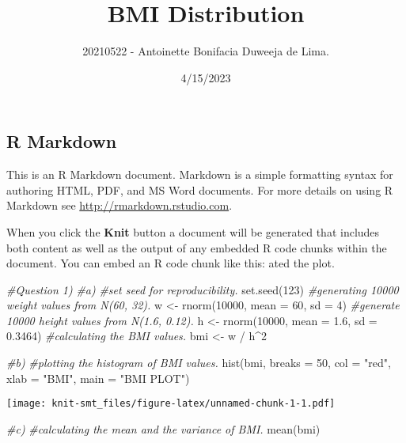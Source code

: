 \documentclass[
]{article}
\title{BMI Distribution}
\author{20210522 - Antoinette Bonifacia Duweeja de Lima.}
\date{4/15/2023}
\newenvironment{Shaded}{\begin{snugshade}}{\end{snugshade}}
\newcommand{\AttributeTok}[1]{\textcolor[rgb]{0.77,0.63,0.00}{#1}}
\newcommand{\CommentTok}[1]{\textcolor[rgb]{0.56,0.35,0.01}{\textit{#1}}}
\newcommand{\DecValTok}[1]{\textcolor[rgb]{0.00,0.00,0.81}{#1}}
\newcommand{\FloatTok}[1]{\textcolor[rgb]{0.00,0.00,0.81}{#1}}
\newcommand{\FunctionTok}[1]{\textcolor[rgb]{0.00,0.00,0.00}{#1}}
\newcommand{\NormalTok}[1]{#1}
\newcommand{\OtherTok}[1]{\textcolor[rgb]{0.56,0.35,0.01}{#1}}
\newcommand{\SpecialCharTok}[1]{\textcolor[rgb]{0.00,0.00,0.00}{#1}}
\newcommand{\StringTok}[1]{\textcolor[rgb]{0.31,0.60,0.02}{#1}}
\begin{document}
\maketitle

\hypertarget{r-markdown}{%
\subsection{R Markdown}\label{r-markdown}}

This is an R Markdown document. Markdown is a simple formatting syntax
for authoring HTML, PDF, and MS Word documents. For more details on
using R Markdown see \url{http://rmarkdown.rstudio.com}.

When you click the \textbf{Knit} button a document will be generated
that includes both content as well as the output of any embedded R code
chunks within the document. You can embed an R code chunk like this:
ated the plot.

\begin{Shaded}
\begin{Highlighting}[]
\CommentTok{\#Question 1)}
\CommentTok{\#a)}
\CommentTok{\#set seed for reproducibility.}
\FunctionTok{set.seed}\NormalTok{(}\DecValTok{123}\NormalTok{)}
\CommentTok{\#generating 10000 weight values from N(60, 32).}
\NormalTok{w }\OtherTok{\textless{}{-}} \FunctionTok{rnorm}\NormalTok{(}\DecValTok{10000}\NormalTok{, }\AttributeTok{mean =} \DecValTok{60}\NormalTok{, }\AttributeTok{sd =} \DecValTok{4}\NormalTok{)}
\CommentTok{\#generate 10000 height values from N(1.6, 0.12).}
\NormalTok{h }\OtherTok{\textless{}{-}} \FunctionTok{rnorm}\NormalTok{(}\DecValTok{10000}\NormalTok{, }\AttributeTok{mean =} \FloatTok{1.6}\NormalTok{, }\AttributeTok{sd =} \FloatTok{0.3464}\NormalTok{)}
\CommentTok{\#calculating the BMI values.}
\NormalTok{bmi }\OtherTok{\textless{}{-}}\NormalTok{ w }\SpecialCharTok{/}\NormalTok{ h}\SpecialCharTok{\^{}}\DecValTok{2}

\CommentTok{\#b)}
\CommentTok{\#plotting the histogram of BMI values.}
\FunctionTok{hist}\NormalTok{(bmi, }\AttributeTok{breaks =} \DecValTok{50}\NormalTok{, }\AttributeTok{col =} \StringTok{"red"}\NormalTok{, }\AttributeTok{xlab =} \StringTok{"BMI"}\NormalTok{, }\AttributeTok{main =} \StringTok{"BMI PLOT"}\NormalTok{)}
\end{Highlighting}
\end{Shaded}

\texttt{[image: knit-smt\_files/figure-latex/unnamed-chunk-1-1.pdf]}

\begin{Shaded}
\begin{Highlighting}[]
\CommentTok{\#c)}
\CommentTok{\#calculating the mean and the variance of BMI.}
\FunctionTok{mean}\NormalTok{(bmi)}
\end{Highlighting}
\end{Shaded}
\end{document}
